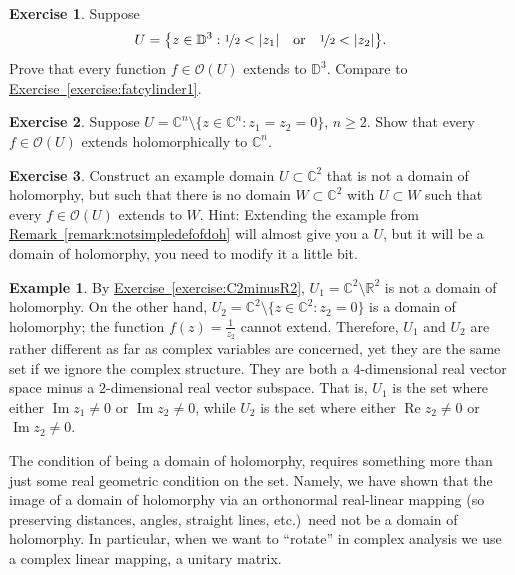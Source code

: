 \documentclass[12pt,openany]{book}
\newcommand{\avoidbreak}{\postdisplaypenalty=100}
\renewcommand{\Re}{\operatorname{Re}}
\renewcommand{\Im}{\operatorname{Im}}
\newcommand{\sabs}[1]{\lvert {#1} \rvert}
\newcommand{\C}{{\mathbb{C}}}
\newcommand{\R}{{\mathbb{R}}}
\newcommand{\D}{{\mathbb{D}}}
\newcommand{\sO}{{\mathscr{O}}}
\theoremstyle{plain}
\theoremstyle{remark}
\theoremstyle{definition}
\newenvironment{exbox}{%
    \def\FrameCommand{\vrule width 1pt \relax\hspace{10pt}}%
    \MakeFramed{\advance\hsize-\width\FrameRestore}%
}{%
    \endMakeFramed
}
\theoremstyle{exercise}
\newtheorem{exercise}{Exercise}[section]
\theoremstyle{example}
\newtheorem{example}[thm]{Example}
\newcommand{\exerciseref}[1]{\hyperref[#1]{Exercise~\ref*{#1}}}
\newcommand{\remarkref}[1]{\hyperref[#1]{Remark~\ref*{#1}}}
\begin{document}
\begin{exbox}
\begin{exercise} \label{exercise:fatcylinder2}
Suppose
\begin{equation*}
U = \bigl\{ z \in \D^3 :
\nicefrac{1}{2} < \sabs{z_1} \quad\text{or}\quad
\nicefrac{1}{2} < \sabs{z_2} \bigr\} .
\avoidbreak
\end{equation*}
Prove that every function $f \in \sO(U)$ extends to $\D^3$.
Compare to \exerciseref{exercise:fatcylinder1}.
\end{exercise}

\begin{exercise} \label{exercise:codim2extends}
Suppose $U = \C^n \setminus \{ z \in \C^n : z_1 = z_2 = 0 \}$, $n
\geq 2$.  Show that every $f \in \sO(U)$ extends holomorphically to
$\C^n$.
\end{exercise}


\begin{exercise} \label{exercise:notsimpledefofdoh}
Construct an example domain $U \subset \C^2$ that is not a domain of
holomorphy, but such that there is no domain $W \subset \C^2$ with $U
\subset W$ such that every $f \in \sO(U)$ extends to $W$.
Hint: Extending the example from \remarkref{remark:notsimpledefofdoh} will
almost give you a $U$, but it will be a domain of holomorphy, you need to modify it
a little bit.
\end{exercise}
\end{exbox}

\begin{example}
By
\exerciseref{exercise:C2minusR2},
$U_1 = \C^2 \setminus \R^2$
is not a domain of holomorphy.  On the other hand,
$U_2 = \C^2 \setminus \{ z \in \C^2 : z_2 = 0 \}$ is a domain of holomorphy;
the function $f(z) = \frac{1}{z_2}$ cannot extend.
Therefore, $U_1$ and $U_2$ are rather different as far as complex variables are
concerned, yet they are the same set if we ignore the complex structure.
They are both a $4$-dimensional real vector space minus a $2$-dimensional
real vector subspace.  That is, $U_1$ is the set
where either $\Im z_1 \not= 0$ or $\Im z_2 \not= 0$,
while $U_2$ is the set
where either $\Re z_2 \not= 0$ or $\Im z_2 \not= 0$.

The condition of being a domain of holomorphy,
requires something more than just some real geometric condition on the
set.  Namely, we have shown that the image of a domain of holomorphy
via an orthonormal real-linear mapping
(so preserving distances, angles, straight lines,
etc.)\ need not be a domain of holomorphy.  In particular, when we want to
``rotate'' in complex analysis we use a complex linear mapping,
a unitary matrix.
\end{example}
\end{document}
